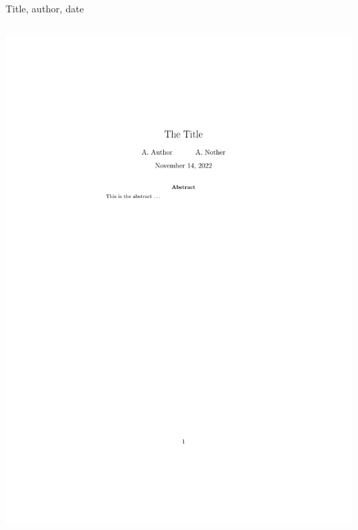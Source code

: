 \documentclass[,aspectratio=43]{beamer}
\begin{document}
\begin{frame}[fragile]{Title, author, date}
\begin{columns}[T]
\begin{column}{0.43\textwidth}
\begin{center}\includegraphics[width=1\linewidth]{figure/maketitle} \end{center}
\end{column}
\end{columns}
\end{frame}
\end{document}
